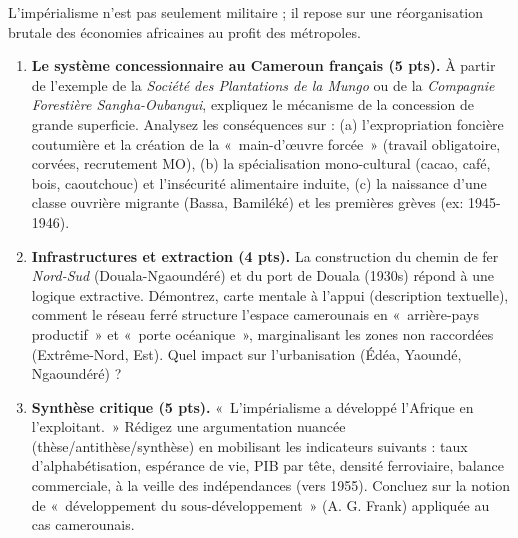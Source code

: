 \documentclass[11pt]{article}
\begin{document}
\begin{exercice}
\noindent L'impérialisme n'est pas seulement militaire ; il repose sur une réorganisation brutale des économies africaines au profit des métropoles.

\begin{enumerate}
    \item \textbf{Le système concessionnaire au Cameroun français (5 pts).} À partir de l'exemple de la \textit{Société des Plantations de la Mungo} ou de la \textit{Compagnie Forestière Sangha-Oubangui}, expliquez le mécanisme de la concession de grande superficie. Analysez les conséquences sur : (a) l'expropriation foncière coutumière et la création de la «~main-d'œuvre forcée~» (travail obligatoire, corvées, recrutement MO), (b) la spécialisation mono-cultural (cacao, café, bois, caoutchouc) et l'insécurité alimentaire induite, (c) la naissance d'une classe ouvrière migrante (Bassa, Bamiléké) et les premières grèves (ex: 1945-1946).
    \item \textbf{Infrastructures et extraction (4 pts).} La construction du chemin de fer \textit{Nord-Sud} (Douala-Ngaoundéré) et du port de Douala (1930s) répond à une logique extractive. Démontrez, carte mentale à l'appui (description textuelle), comment le réseau ferré structure l'espace camerounais en «~arrière-pays productif~» et «~porte océanique~», marginalisant les zones non raccordées (Extrême-Nord, Est). Quel impact sur l'urbanisation (Édéa, Yaoundé, Ngaoundéré) ?
    \item \textbf{Synthèse critique (5 pts).} «~L'impérialisme a développé l'Afrique en l'exploitant.~» Rédigez une argumentation nuancée (thèse/antithèse/synthèse) en mobilisant les indicateurs suivants : taux d'alphabétisation, espérance de vie, PIB par tête, densité ferroviaire, balance commerciale, à la veille des indépendances (vers 1955). Concluez sur la notion de «~développement du sous-développement~» (A. G. Frank) appliquée au cas camerounais.
\end{enumerate}
\end{exercice}
\end{document}
